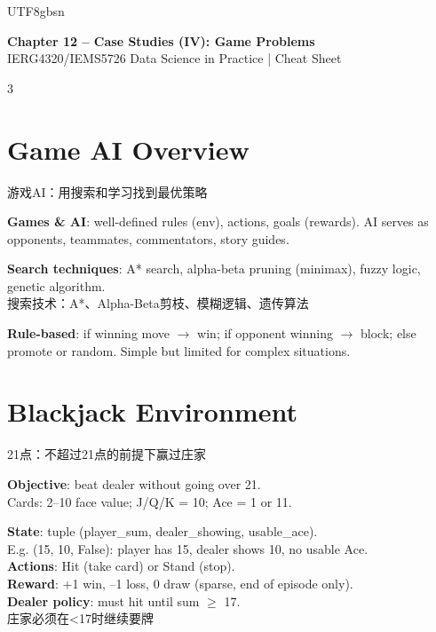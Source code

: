 \documentclass[9pt,landscape,a4paper]{article}
\newcommand{\zhint}[1]{{\scriptsize\color{gray!70!black}#1}}
\begin{document}
\begin{CJK}{UTF8}{gbsn}

\begin{center}
{\large\bfseries\color{blue!70!black} Chapter 12 -- Case Studies (IV): Game Problems}\\
{\footnotesize IERG4320/IEMS5726 Data Science in Practice | Cheat Sheet}
\end{center}

\begin{multicols}{3}

\section{Game AI Overview}
\zhint{游戏AI：用搜索和学习找到最优策略}

\textbf{Games \& AI}: well-defined rules (env), actions, goals (rewards). AI serves as opponents, teammates, commentators, story guides.

\textbf{Search techniques}: A* search, alpha-beta pruning (minimax), fuzzy logic, genetic algorithm.\\
\zhint{搜索技术：A*、Alpha-Beta剪枝、模糊逻辑、遗传算法}

\textbf{Rule-based}: if winning move $\to$ win; if opponent winning $\to$ block; else promote or random. Simple but limited for complex situations.

\section{Blackjack Environment}
\zhint{21点：不超过21点的前提下赢过庄家}

\textbf{Objective}: beat dealer without going over 21.\\
Cards: 2--10 face value; J/Q/K = 10; Ace = 1 or 11.

\textbf{State}: tuple (player\_sum, dealer\_showing, usable\_ace).\\
E.g. (15, 10, False): player has 15, dealer shows 10, no usable Ace.\\
\textbf{Actions}: Hit (take card) or Stand (stop).\\
\textbf{Reward}: +1 win, --1 loss, 0 draw (sparse, end of episode only).\\
\textbf{Dealer policy}: must hit until sum $\geq$ 17.\\
\zhint{庄家必须在<17时继续要牌}


\end{multicols}
\end{CJK}
\end{document}
